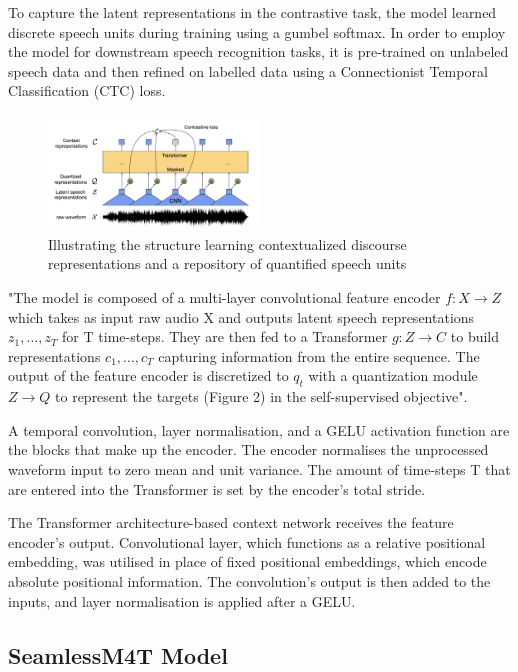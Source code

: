 \documentclass[conference]{IEEEtran}
\begin{document}
To capture the latent representations in the contrastive task, the model learned discrete speech units during training using a gumbel softmax. In order to employ the model for downstream speech recognition tasks, it is pre-trained on unlabeled speech data and then refined on labelled data using a Connectionist Temporal Classification (CTC) loss.

\begin{figure}[ht]
\centering
\includegraphics[width=0.5\textwidth]{15.png}
\caption{Illustrating the structure learning contextualized discourse representations and a repository of quantified speech units}
\label{fig:whisper_asr_architecture}
\end{figure}

"The model is composed of a multi-layer convolutional feature encoder \( f : X \rightarrow Z \) which takes as input raw audio X and outputs latent speech representations \( z_1, \ldots, z_T \) for T time-steps. They are then fed to a Transformer \( g:Z \rightarrow C \) to build representations \(c_1,\ldots,c_T\) capturing information from the entire sequence. The output of the feature encoder is discretized to \(q_t\) with a quantization module \( Z \rightarrow Q \) to represent the targets (Figure 2) in the self-supervised objective".

A temporal convolution, layer normalisation, and a GELU activation function are the blocks that make up the encoder. The encoder normalises the unprocessed waveform input to zero mean and unit variance. The amount of time-steps T that are entered into the Transformer is set by the encoder's total stride.

The Transformer architecture-based context network receives the feature encoder's output. Convolutional layer, which functions as a relative positional embedding, was utilised in place of fixed positional embeddings, which encode absolute positional information. The convolution's output is then added to the inputs, and layer normalisation is applied after a GELU. \cite{baevski2020}

\subsection{SeamlessM4T Model}
\end{document}
